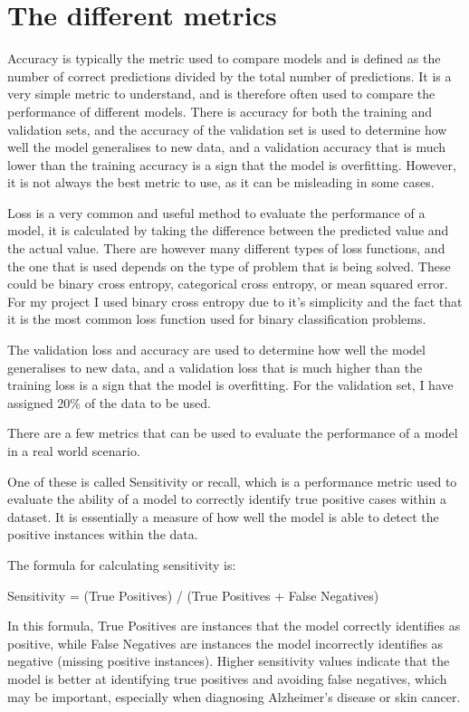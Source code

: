 \documentclass[]{final_report}
\begin{document}
\section{The different metrics}
Accuracy is typically the metric used to compare models and is defined as the number of correct predictions divided by the total number of predictions.
It is a very simple metric to understand, and is therefore often used to compare the performance of different models.
There is accuracy for both the training and validation sets, and the accuracy of the validation set is used to determine how well the model generalises to new data,
and a validation accuracy that is much lower than the training accuracy is a sign that the model is overfitting.
However, it is not always the best metric to use, as it can be misleading in some cases.

Loss is a very common and useful method to evaluate the performance of a model, it is calculated by taking the difference between the predicted value and the actual value.
There are however many different types of loss functions, and the one that is used depends on the type of problem that is being solved.
These could be binary cross entropy, categorical cross entropy, or mean squared error. For my project I used binary cross entropy due
to it's simplicity and the fact that it is the most common loss function used for binary classification problems.

The validation loss and accuracy are used to determine how well the model generalises to new data, and a validation loss that is much higher than the training loss is a sign that the model is overfitting.
For the validation set, I have assigned 20\% of the data to be used.

There are a few metrics that can be used to evaluate the performance of a model in a real world scenario.

One of these is called Sensitivity or recall, which is a performance metric used to evaluate the ability of a model to correctly identify true positive cases within a dataset. It is essentially a measure of how well the model is able to detect the positive instances within the data.

The formula for calculating sensitivity is:

Sensitivity = (True Positives) / (True Positives + False Negatives)

In this formula, True Positives are instances that the model correctly identifies as positive, while False Negatives are instances the model incorrectly identifies as negative (missing positive instances).
Higher sensitivity values indicate that the model is better at identifying true positives and avoiding false negatives, which may be important, especially when diagnosing Alzheimer's disease or skin cancer.
\end{document}
